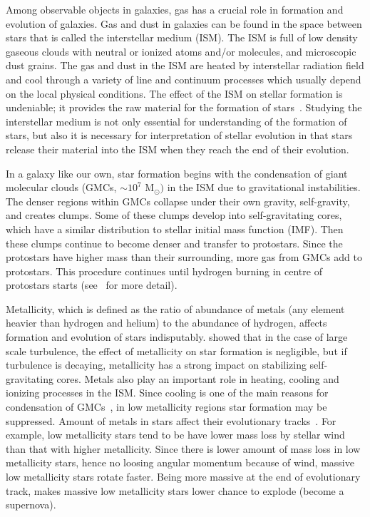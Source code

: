 Among observable objects in galaxies, gas has a crucial role in formation and evolution of galaxies.
Gas and dust in galaxies can be found in the space between stars that is called the interstellar medium (ISM). The ISM is full of low density gaseous clouds with neutral or ionized atoms and/or molecules, and microscopic dust grains.
The gas and dust in the ISM are heated by interstellar radiation field and cool through a variety of line and continuum processes which usually depend on the local physical conditions. 
The effect of the ISM on stellar formation is undeniable;  it provides the raw material for the formation of stars~\citep[e.g.][]{Kennicutt08,Bigiel08}.
Studying the interstellar medium is not only essential for understanding of the formation of stars, but also it is necessary for interpretation of stellar evolution in that stars release their material into the ISM when they reach the end of their evolution.


In a galaxy like our own, star formation begins with the condensation of giant molecular clouds (GMCs, $\sim 10^7$ M$_{\odot})$ in the ISM due to gravitational instabilities. 
The denser regions within GMCs collapse under their own gravity, self-gravity, and creates clumps.
Some of these clumps develop into self-gravitating cores, which have a similar distribution to stellar initial mass function (IMF).
Then these clumps continue to become denser and transfer to protostars. 
Since the protostars have higher mass than their surrounding, more gas from GMCs add to protostars.
This procedure continues until hydrogen burning in centre of protostars starts (see~\cite{McKee07} for more detail). 

Metallicity, which is defined as the ratio of abundance of metals (any element heavier than hydrogen and helium) to the abundance of hydrogen, affects formation and evolution of stars indisputably.
\cite{Walch11} showed that in the case of large scale turbulence, the effect of metallicity on star formation is negligible, but if turbulence is decaying,  metallicity has a strong impact on stabilizing self-gravitating cores.
Metals also play an important role in heating, cooling and ionizing processes in the ISM.
Since cooling is one of the main reasons for condensation of GMCs~\citep[e.g.][]{Maio07}, in low metallicity regions star formation may be suppressed. 
Amount of metals in stars affect their evolutionary tracks~\citep[e.g.][and references therein]{Maeder02}.
For example, low metallicity stars tend to be have lower mass loss by stellar wind than that with higher metallicity.
Since there is lower amount of mass loss in low metallicity stars, hence no loosing angular momentum because of wind, massive low metallicity stars rotate faster.
Being more massive at the end of evolutionary track, makes massive low metallicity stars lower chance to explode (become a supernova).


